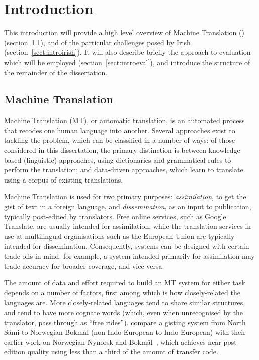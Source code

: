 \chapter{Introduction}

This introduction will provide a high level overview of Machine Translation () (section~\ref{sect:intromt}), and of the 
particular challenges posed by Irish (section~\ref{sect:introirish}).
It will also describe briefly the approach to evaluation 
which will be employed (section~\ref{sect:introeval}), and introduce the structure of the remainder of the dissertation.



\section{Machine Translation}
\label{sect:intromt}

Machine Translation (MT), or automatic translation, is an automated process that recodes one human language 
into another. Several approaches exist to tackling the problem, which can be classified in a number of 
ways: of those considered in this dissertation, the primary distinction is between knowledge-based (linguistic) approaches, 
using dictionaries and grammatical rules to perform the translation; and data-driven approaches, which 
learn to translate using a corpus of existing translations.

Machine Translation is used for two primary purposes: \textit{assimilation}, to get the gist of text in 
a foreign language, and \textit{dissemination}, as an input to publication, typically post-edited by 
translators. Free online services, such as Google Translate, are usually intended for assimilation, 
while the translation services in use at multilingual organisations such as the European Union are 
typically intended for dissemination. Consequently, systems can be designed with certain 
trade-offs in mind: for example, a system intended primarily for assimilation may trade accuracy for 
broader coverage, and vice versa.

The amount of data and effort required to build an MT system for either task depends on a number of 
factors, first among which is how closely-related the languages are. More closely-related languages 
tend to share similar structures, and tend to have more cognate words (which, even when unrecognised 
by the translator, pass through as ``free rides''). \cite{trosterud2012evaluating} compare a gisting 
system from North S\'ami to Norwegian Bokm{\aa}l (non-Indo-European to Indo-European) with their earlier 
work on Norwegian Nynorsk and Bokm{\aa}l~\citep{unhammer2009rfr}, which achieves near post-edition quality 
using less than a third of the amount of transfer code. 

